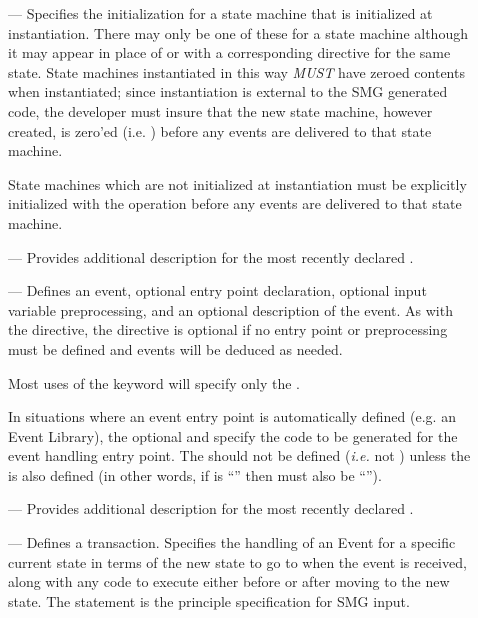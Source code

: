 \begin{description}
\item[\hypertarget{INITSTATE}{}] --- Specifies the
  initialization for a state machine that is initialized at
  instantiation.  There may only be one of these for a state machine
  although it may appear in place of or with a corresponding
  \STATE directive for the same state.  State machines
  instantiated in this way {\em MUST} have zeroed contents when
  instantiated; since instantiation is external to the SMG generated
  code, the developer must insure that the new state machine, however
  created, is zero'ed (i.e. )
  before any events are delivered to that state machine.
  
  State machines which are not initialized at instantiation must be
  explicitly initialized with the 
  operation before any events are delivered to that state machine.
  
\item[\hypertarget{STDESC}{}] --- Provides additional
  description for the most recently declared \STATE.
  
\item[\hypertarget{EVENT}{}] --- Defines an event, optional
  entry point declaration, optional input variable preprocessing, and
  an optional description of the event.  As with the \STATE
  directive, the  directive is optional if no entry point
  or preprocessing must be defined and events will be deduced as
  needed.
  
  Most uses of the  keyword will specify only the
  .
  
  In situations where an event entry point is automatically defined
  (e.g. an \hypertarget{eventlib}{Event Library}), the optional
   and  specify the code
  to be generated for the event handling entry point.  The
   should not be defined ({\it i.e.} not
  \smg{--}) unless the  is also defined (in
  other words, if  is ``\smg{--}'' then
   must also be ``\smg{--}'').
  
\item[\hypertarget{EVDESC}{}] --- Provides additional
  description for the most recently declared \EVENT.

\item[\hypertarget{TRANS}{}] --- Defines a transaction.
  Specifies the handling of an Event for a specific current state in
  terms of the new state to go to when the event is received, along
  with any code to execute either before or after moving to the new
  state.  The  statement is the principle specification for
  SMG input.
  

\end{description}

